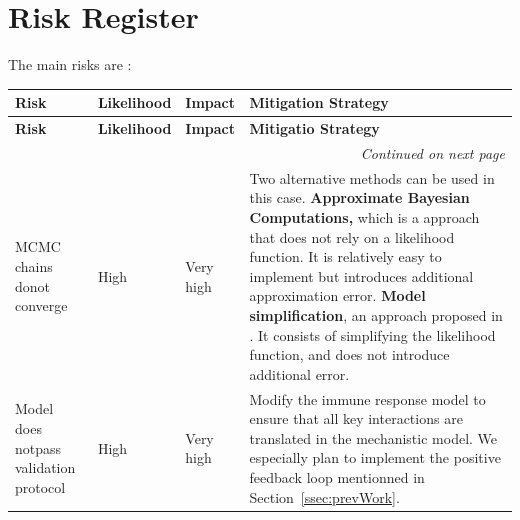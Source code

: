 \documentclass[11pt]{article}
\begin{document}
\section{Risk Register}
The main risks are : 

\begin{table}[!ht]
    \caption{Table of the different risks associated with the project's objectives}

    \label{tbl:hyperparams}
\begin{longtable}{|p{3.5cm}|p{2.3cm}|p{2.3cm}|p{8cm}|}
    \hline
    \textbf{Risk} & \textbf{Likelihood} & \textbf{Impact} & \textbf{Mitigation Strategy}\\
    \hline
    \endfirsthead
    \hline
    \textbf{Risk} & \textbf{Likelihood} & \textbf{Impact} & \textbf{Mitigatio Strategy}\\
    \hline
    \endhead
    \hline
    \multicolumn{4}{|r|}{\textit{Continued on next page}} \\
    \hline
    \endfoot
    \hline
\endlastfoot
        \hline
        MCMC chains do\newline not converge  & High & Very high & 
        Two alternative methods can be used in this case.
        \textbf{Approximate Bayesian Computations,} which is a approach that does not rely on a likelihood function. It is relatively easy to implement but introduces additional approximation error. \textbf{Model simplification}, an approach proposed in \cite{gelman2020bayesian}. It consists of simplifying the likelihood function, and does not introduce additional error.
        \\ \hline 
        Model does not\newline pass validation protocol& High & Very high & Modify the immune response model to ensure that all key interactions are translated in the mechanistic model. We especially plan to implement the positive feedback loop mentionned in Section~\ref{ssec:prevWork}. \\ \hline 
\end{longtable}
\end{table}
\end{document}
